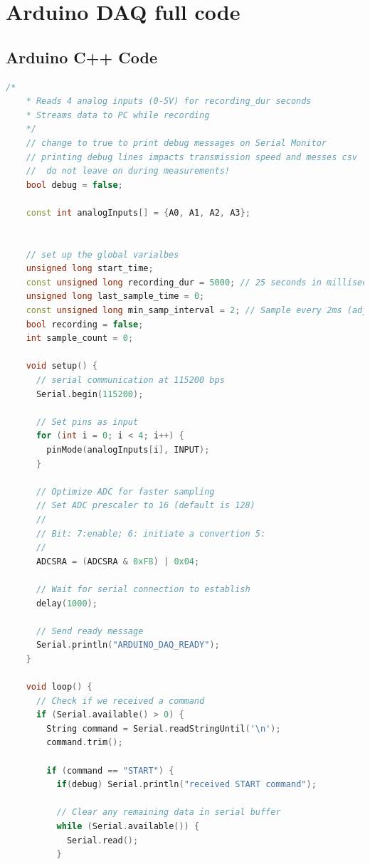 \section{Arduino DAQ full code}
\subsection{Arduino C++ Code}
\label{subsec:arduinoCppcode}
\begin{lstlisting}[style=cstyle, caption=C++ Code on Arduino, label=lst:arduinoCodeApp, language=C++]
    /*
    * Reads 4 analog inputs (0-5V) for recording_dur seconds
    * Streams data to PC while recording
    */
    // change to true to print debug messages on Serial Monitor
    // printing debug lines impacts transmission speed and messes csv
    //  do not leave on during measurements!
    bool debug = false;
  
    const int analogInputs[] = {A0, A1, A2, A3};
    
    
    // set up the global varialbes
    unsigned long start_time;
    const unsigned long recording_dur = 5000; // 25 seconds in milliseconds (ENSURE python code is greater than this)
    unsigned long last_sample_time = 0;
    const unsigned long min_samp_interval = 2; // Sample every 2ms (adjust for stability)
    bool recording = false;
    int sample_count = 0;
    
    void setup() {
      // serial communication at 115200 bps
      Serial.begin(115200);
      
      // Set pins as input
      for (int i = 0; i < 4; i++) {
        pinMode(analogInputs[i], INPUT);
      }
      
      // Optimize ADC for faster sampling
      // Set ADC prescaler to 16 (default is 128)
      //
      // Bit: 7:enable; 6: initiate a convertion 5: 
      //
      ADCSRA = (ADCSRA & 0xF8) | 0x04;
      
      // Wait for serial connection to establish
      delay(1000);
      
      // Send ready message
      Serial.println("ARDUINO_DAQ_READY");
    }
    
    void loop() {
      // Check if we received a command
      if (Serial.available() > 0) {
        String command = Serial.readStringUntil('\n');
        command.trim();
        
        if (command == "START") {
          if(debug) Serial.println("received START command");
  
          // Clear any remaining data in serial buffer
          while (Serial.available()) {
            Serial.read();
          }
          

\end{lstlisting}
